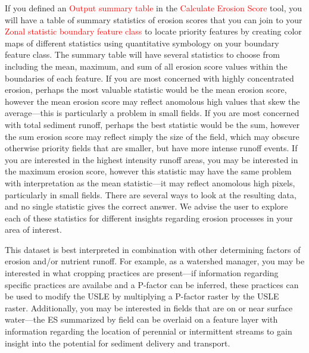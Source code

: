 \documentclass{article}
\newcommand{\toolPar}[1]{\textcolor{red}{#1}}
\begin{document}
	If you defined an \toolPar{Output summary table} in the \toolPar{Calculate Erosion Score} tool, you will have a table of summary statistics of erosion scores that you can join to your \toolPar{Zonal statistic boundary feature class} to locate priority features by creating color maps of different statistics using quantitative symbology on your boundary feature class. The summary table will have several statistics to choose from including the mean, maximum, and sum of all erosion score values within the boundaries of each feature. If you are most concerned with highly concentrated erosion, perhaps the most valuable statistic would be the mean erosion score, however the mean erosion score may reflect anomolous high values that skew the average---this is particularly a problem in small fields. If you are most concerned with total sediment runoff, perhaps the best statistic would be the sum, however the sum erosion score may reflect simply the size of the field, which may obscure otherwise priority fields that are smaller, but have more intense runoff events. If you are interested in the highest intensity runoff areas, you may be interested in the maximum erosion score, however this statistic may have the same problem with interpretation as the mean statistic---it may reflect anomolous high pixels, particularly in small fields. There are several ways to look at the resulting data, and no single statistic gives the correct answer. We advise the user to explore each of these statistics for different insights regarding erosion processes in your area of interest.
	
	This dataset is best interpreted in combination with other determining factors of erosion and/or nutrient runoff. For example, as a watershed manager, you may be interested in what cropping practices are present---if information regarding specific practices are availabe and a P-factor can be inferred, these practices can be used to modify the USLE by multiplying a P-factor raster by the USLE raster. Additionally, you may be interested in fields that are on or near surface water---the ES summarized by field can be overlaid on a feature layer with information regarding the location of perennial or intermittent streams to gain insight into the potential for sediment delivery and transport.
	
\end{document}
